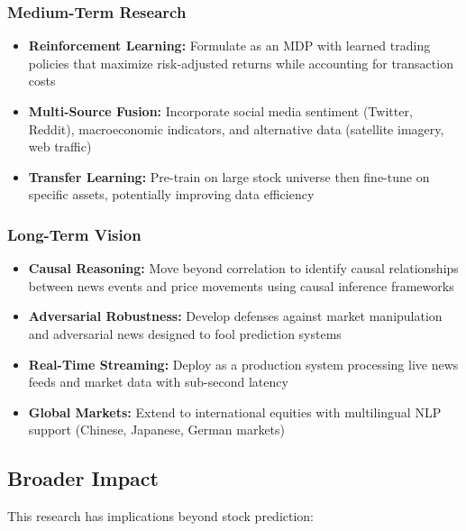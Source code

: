\documentclass[conference]{IEEEtran}
\begin{document}
\subsubsection{Medium-Term Research}
\begin{itemize}
\item \textbf{Reinforcement Learning:} Formulate as an MDP with learned trading policies that maximize risk-adjusted returns while accounting for transaction costs
\item \textbf{Multi-Source Fusion:} Incorporate social media sentiment (Twitter, Reddit), macroeconomic indicators, and alternative data (satellite imagery, web traffic)
\item \textbf{Transfer Learning:} Pre-train on large stock universe then fine-tune on specific assets, potentially improving data efficiency
\end{itemize}

\subsubsection{Long-Term Vision}
\begin{itemize}
\item \textbf{Causal Reasoning:} Move beyond correlation to identify causal relationships between news events and price movements using causal inference frameworks
\item \textbf{Adversarial Robustness:} Develop defenses against market manipulation and adversarial news designed to fool prediction systems
\item \textbf{Real-Time Streaming:} Deploy as a production system processing live news feeds and market data with sub-second latency
\item \textbf{Global Markets:} Extend to international equities with multilingual NLP support (Chinese, Japanese, German markets)
\end{itemize}

\subsection{Broader Impact}

This research has implications beyond stock prediction:
\end{document}
